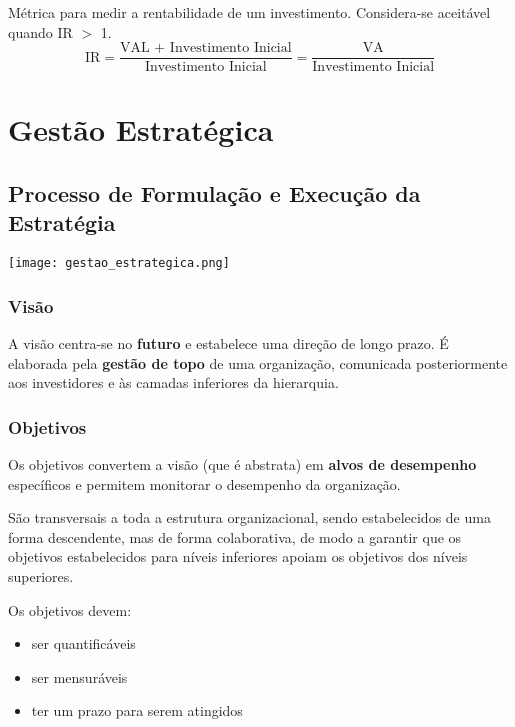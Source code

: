 \documentclass[11pt]{article}
\begin{document}
Métrica para medir a rentabilidade de um investimento. Considera-se aceitável quando IR $>$ 1.
\begin{equation*}
    \text{IR} = \frac{\text{VAL + Investimento Inicial}}{\text{Investimento Inicial}}
    = \frac{\text{VA}}{\text{Investimento Inicial}}
\end{equation*}

\newpage

\section{Gestão Estratégica}

\subsection{Processo de Formulação e Execução da Estratégia}

\texttt{[image: gestao\_estrategica.png]}

\subsubsection{Visão}

A visão centra-se no \textbf{futuro} e estabelece uma direção de longo prazo. É elaborada pela \textbf{gestão de topo} de uma organização, comunicada posteriormente aos investidores e às camadas inferiores da hierarquia.

\subsubsection{Objetivos}

Os objetivos convertem a visão (que é abstrata) em \textbf{alvos de desempenho} específicos e permitem monitorar o desempenho da organização.

São transversais a toda a estrutura organizacional, sendo estabelecidos de uma forma descendente, mas de forma colaborativa, de modo a garantir que os objetivos estabelecidos para níveis inferiores apoiam os objetivos dos níveis superiores.

Os objetivos devem:
\begin{itemize}[topsep=-4pt,itemsep=0pt]
    \item ser quantificáveis
    \item ser mensuráveis
    \item ter um prazo para serem atingidos
\end{itemize}
\end{document}

